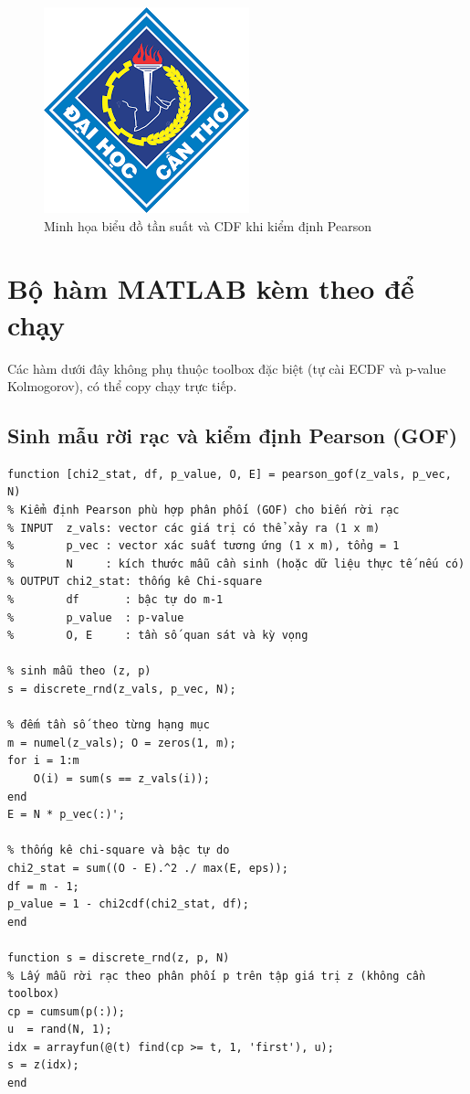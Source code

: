 \begin{figure}[h!]
    \centering
    \includegraphics[width=.75\linewidth]{../../assets/logos/university-logo.png}
    \caption{Minh họa biểu đồ tần suất và CDF khi kiểm định Pearson}
\end{figure}

\section{Bộ hàm MATLAB kèm theo để chạy}
Các hàm dưới đây không phụ thuộc toolbox đặc biệt (tự cài ECDF và p-value Kolmogorov), có thể copy chạy trực tiếp.

\subsection{Sinh mẫu rời rạc và kiểm định Pearson (GOF)}
\begin{matlab}
\begin{lstlisting}
function [chi2_stat, df, p_value, O, E] = pearson_gof(z_vals, p_vec, N)
% Kiểm định Pearson phù hợp phân phối (GOF) cho biến rời rạc
% INPUT  z_vals: vector các giá trị có thể xảy ra (1 x m)
%        p_vec : vector xác suất tương ứng (1 x m), tổng = 1
%        N     : kích thước mẫu cần sinh (hoặc dữ liệu thực tế nếu có)
% OUTPUT chi2_stat: thống kê Chi-square
%        df       : bậc tự do m-1
%        p_value  : p-value
%        O, E     : tần số quan sát và kỳ vọng

% sinh mẫu theo (z, p)
s = discrete_rnd(z_vals, p_vec, N);

% đếm tần số theo từng hạng mục
m = numel(z_vals); O = zeros(1, m);
for i = 1:m
    O(i) = sum(s == z_vals(i));
end
E = N * p_vec(:)';

% thống kê chi-square và bậc tự do
chi2_stat = sum((O - E).^2 ./ max(E, eps));
df = m - 1;
p_value = 1 - chi2cdf(chi2_stat, df);
end

function s = discrete_rnd(z, p, N)
% Lấy mẫu rời rạc theo phân phối p trên tập giá trị z (không cần toolbox)
cp = cumsum(p(:));
u  = rand(N, 1);
idx = arrayfun(@(t) find(cp >= t, 1, 'first'), u);
s = z(idx);
end
\end{lstlisting}
\end{matlab}

